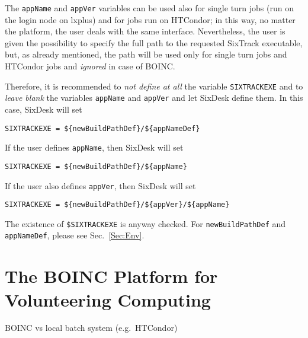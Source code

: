 The \texttt{appName} and \texttt{appVer} variables can be used
also for single turn jobs (run on the login node on lxplus)
and for jobs run on HTCondor; in this way, no matter the platform,
the user deals with the same interface. Nevertheless,
the user is given the possibility to specify the full path to
the requested SixTrack executable, but, as already mentioned, the
path will be used only for single turn jobs and HTCondor jobs and
\emph{ignored} in case of BOINC.

Therefore, it is recommended to \emph{not define at all}
the variable \texttt{SIXTRACKEXE} and to \emph{leave blank}
the variables \texttt{appName} and \texttt{appVer} and let
SixDesk define them. In this case, SixDesk will set
\begin{lstlisting}
SIXTRACKEXE = ${newBuildPathDef}/${appNameDef}
\end{lstlisting}
If the user defines \texttt{appName}, then SixDesk will set
\begin{lstlisting}
SIXTRACKEXE = ${newBuildPathDef}/${appName}
\end{lstlisting}
If the user also defines \texttt{appVer}, then SixDesk will set
\begin{lstlisting}
SIXTRACKEXE = ${newBuildPathDef}/${appVer}/${appName}
\end{lstlisting}
The existence of \texttt{\${SIXTRACKEXE}} is anyway checked.
For \texttt{newBuildPathDef} and \texttt{appNameDef},
please see Sec.~\ref{Sec:Env}.

\section{The BOINC Platform for Volunteering Computing}
BOINC vs local batch system (e.g.~HTCondor)

